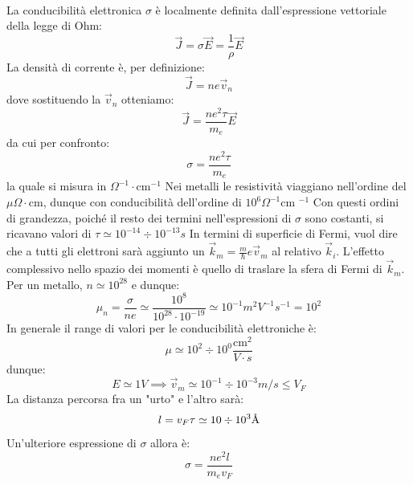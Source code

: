 \documentclass{book}
\begin{document}
        \paragraph{}
            La conducibilità elettronica $\sigma$ è localmente definita dall'espressione vettoriale della legge di Ohm:
            $$\vec{J} = \sigma \vec{E} = \frac{1}{\rho} \vec{E}$$
            La densità di corrente è, per definizione:
            $$\vec{J} = ne\vec{v}_{n}$$
            dove sostituendo la $\vec{v}_{n}$ otteniamo:
            $$\vec{J} = \frac{ne^{2}\tau}{m_{e}}\vec{E}$$
            da cui per confronto:
            $$\sigma = \frac{ne^{2}\tau}{m_{e}}$$
            la quale si misura in $\Omega^{-1}\cdot \textrm{cm}^{-1}$
            Nei metalli le resistività viaggiano nell'ordine del $\mu \Omega \cdot \textrm{cm}$, dunque con conducibilità dell'ordine di $10^{6} \Omega^{-1} \textrm{cm }^{-1}$
            Con questi ordini di grandezza, poiché il resto dei termini nell'espressioni di $\sigma$ sono costanti, si ricavano valori di $\tau \simeq 10^{-14} \div 10^{-13} s$
            In termini di superficie di Fermi, vuol dire che a tutti gli elettroni sarà aggiunto un $\vec{k}_{m} = \displaystyle \frac{m}{\hbar} e \vec{v}_{m}$ al relativo $\vec{k}_{i}$.
            L'effetto complessivo nello spazio dei momenti è quello di traslare la sfera di Fermi di $\vec{k}_{m}$. Per un metallo, $n \simeq 10^{28}$ e dunque:
            $$\mu_{n} = \frac{\sigma}{n e} \simeq \frac{10^{8}}{10^{28} \cdot 10^{-19}} \simeq 10^{-1}m^{2}V^{-1}s^{-1} = 10^{2}$$
            In generale il range di valori per le conducibilità elettroniche è:
            $$\mu \simeq 10^{2} \div 10^{0} \frac{\textrm{cm}^{2}}{V \cdot s}$$
            dunque:
            $$E \simeq 1V \implies \vec{v}_{m} \simeq 10^{-1} \div 10^{-3} m/s \leq V_{F}$$
            La distanza percorsa fra un "urto" e l'altro sarà:
            $$l = v_{F} \tau \simeq 10 \div 10^{3} \textrm{\si{\angstrom}}$$
            Un'ulteriore espressione di $\sigma$ allora è:
            $$\sigma = \frac{ne^{2}l}{m_{e}v_{F}}$$
\end{document}
